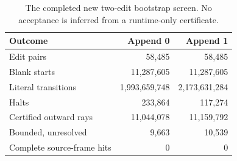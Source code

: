 \begin{table}[ht]\centering\small
\begin{tabular}{lrr}
\toprule
Outcome & Append 0 & Append 1\\
\midrule
Edit pairs&58,485&58,485\\
Blank starts&11,287,605&11,287,605\\
Literal transitions&1,993,659,748&2,173,631,284\\
Halts&233,864&117,274\\
Certified outward rays&11,044,078&11,159,792\\
Bounded, unresolved&9,663&10,539\\
Complete source-frame hits&0&0\\
\bottomrule
\end{tabular}
\caption{The completed new two-edit bootstrap screen. No acceptance is inferred from a runtime-only certificate.}
\end{table}
